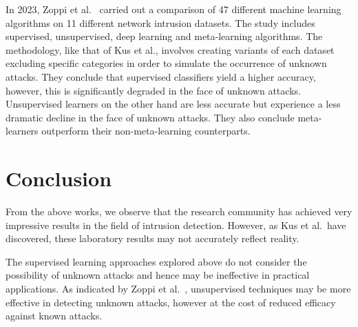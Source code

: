 In 2023, Zoppi et al.~\cite{Zoppi} carried out a comparison of 47 different
machine learning algorithms on 11 different network intrusion datasets. The
study includes supervised, unsupervised, deep learning and meta-learning
algorithms. The methodology, like that of Kus et al., involves creating
variants of each dataset excluding specific categories in order to simulate the
occurrence of unknown attacks. They conclude that supervised classifiers yield
a higher accuracy, however, this is significantly degraded in the face of
unknown attacks. Unsupervised learners on the other hand are less accurate but
experience a less dramatic decline in the face of unknown attacks. They also
conclude meta-learners outperform their non-meta-learning counterparts.

\section{Conclusion}%
\label{sec:conclusion}
From the above works, we observe that the research community has achieved
very impressive results in the field of intrusion detection. However, as Kus et
al.\ have discovered, these laboratory results may not accurately reflect
reality.

The supervised learning approaches explored above do not consider the
possibility of unknown attacks and hence may be ineffective in practical
applications. As indicated by Zoppi et al.~\cite{Zoppi}, unsupervised
techniques may be more effective in detecting unknown attacks, however at the
cost of reduced efficacy against known attacks.
